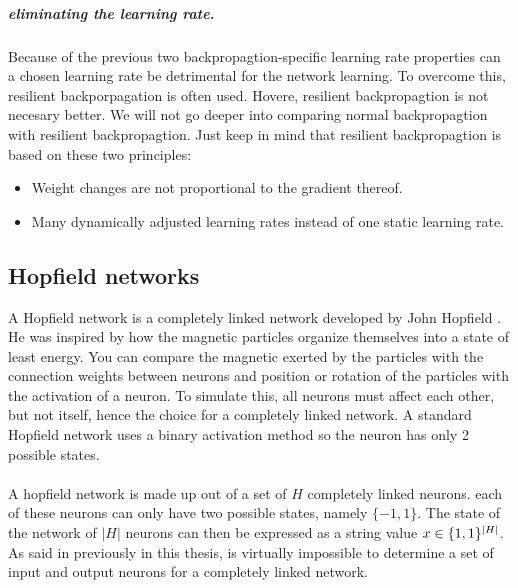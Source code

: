 \documentclass[pdftex,a4paper,12pt,twoside]{report}
\theoremstyle{plain} \newtheorem{theorem}{Theorem} \newtheorem{proposition}{Proposition} \newtheorem{lemma}{Lemma} \newtheorem*{corollary}{Corollary}
\theoremstyle{definition} \newtheorem{definition}{Definition} \newtheorem{conjecture}{Conjecture} \newtheorem*{example}{Example} \newtheorem{algorithm}{Algorithm}
\theoremstyle{remark} \newtheorem*{remark}{Remark} \newtheorem*{note}{Note} \newtheorem{case}{Case}
\begin{document}
\subparagraph{eliminating the learning rate.}
Because of the previous two backpropagtion-specific learning rate properties can a chosen learning rate be detrimental for the network learning. To overcome this, resilient backporpagation is often used. Hovere, resilient backpropagtion is not necesary better. We will not go deeper into comparing normal backpropagtion with resilient backpropagtion. Just keep in mind that resilient backpropagtion is based on these two principles:
\begin{itemize}
\item Weight changes are not proportional to the gradient thereof.
\item Many dynamically adjusted learning rates instead of one static learning rate.
\end{itemize}
\subsection{Hopfield networks}
A Hopfield network is a completely linked network developed by John Hopfield \citep{Hopfield1982}. He was inspired by how the magnetic particles organize themselves into a state of least energy. You can compare the magnetic exerted by the particles with the connection weights between neurons and position or rotation of the particles with the activation of a neuron. To simulate this, all neurons must affect each other, but not itself, hence the choice for a completely linked network. A standard Hopfield network uses a binary activation method so the neuron has only 2 possible states.\\\\
A hopfield network is made up out of a set of $H$ completely linked neurons. each of these neurons can only have two possible states, namely $\{-1,1\}$. The state of the network of $|H|$ neurons can then be expressed as a string value $x \in \{\-1,1\}^{|H|}$. As said in previously in this thesis, is virtually impossible to determine a set of input and output neurons for a completely linked network.
\end{document}
